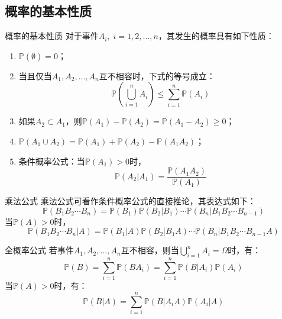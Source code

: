 \documentclass[t]{beamer}
\renewcommand{\Pr}{\mathbb{P}}
\begin{document}
  \subsection{概率的基本性质}
  \begin{frame}{概率的基本性质}
    对于事件$A_i,\; i=1,2,\ldots,n$，其发生的概率具有如下性质：
	\begin{enumerate}
	\item $\Pr(\emptyset)=0$；
	\item 当且仅当$A_1,A_2,\ldots,A_n$互不相容时，下式的等号成立：
\begin{equation*}\Pr\left(\bigcup^{n}_{i=1}A_i\right)\le\sum^{n}_{i=1}\Pr(A_i)
\end{equation*}
\item 如果$A_2\subset A_1$，则$\Pr(A_1)-\Pr(A_2)=\Pr(A_1-A_2)\ge 0$；
	\item $\Pr(A_1\cup A_2)=\Pr(A_1)+\Pr(A_2)-\Pr(A_1A_2)$；
	\item 条件概率公式：当$\Pr(A_1)>0$时，
	\begin{equation*}
	\Pr(A_2|A_1)=\frac{\Pr(A_1A_2)}{\Pr(A_1)}
	\end{equation*}
	
\end{enumerate}
  
  \end{frame}
  
  \begin{frame}{乘法公式}
    乘法公式可看作条件概率公式的直接推论，其表达式如下：
    \begin{equation*}\Pr(B_1B_2\cdots
    B_n)=\Pr(B_1)\Pr(B_2|B_1)\cdots
    \Pr(B_n|B_1B_2\cdots B_{n-1}) \end{equation*}
      当$\Pr(A)>0$时，
    \begin{equation*}\Pr(B_1B_2\cdots
    B_n|A)=\Pr(B_1|A)\Pr(B_2|B_1A)\cdots
    \Pr(B_n|B_1B_2\cdots B_{n-1}A) \end{equation*}
  
  \end{frame}



  \begin{frame}{全概率公式}
    若事件$A_1,A_2,\ldots, A_n$互不相容，则当$\displaystyle\bigcup^{n}_{i=1}A_i=\Omega$时，有：\begin{equation*}\Pr(B)=\sum^{n}_{i=1}\Pr(BA_i)=\sum^{n}_{i=1}\Pr(B|A_i)\Pr(A_i)
    \end{equation*}
      当$\Pr(A)>0$时，有：
      \begin{equation*}
      \Pr(B|A)=\sum^{n}_{i=1}\Pr(B|A_iA)\Pr(A_i|A) 
      \end{equation*}
    \end{frame}
\end{document}
